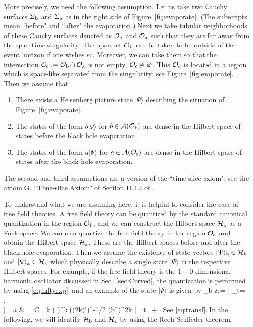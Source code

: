 \documentclass[a4paper,11pt]{article}
\theoremstyle{plain}
\theoremstyle{definition}
\numberwithin{thm}{section}
\newcommand{\ket}[1]{ | {#1} \rangle }
\def\CA{{\cal A}}
\def\CH{{\cal H}}
\def\CO{{\cal O}}
\def\beq#1\eeq{\begin{align}#1\end{align}}
\begin{document}
More precisely, we need the following assumption. Let us take two Cauchy surfaces $\Sigma_{\rm b}$ and $\Sigma_{\rm a}$
as in the right side of Figure~\ref{fig:evaporate}.  (The subscripts mean ``before" and ``after" the evaporation.)
Next we take tubular neighborhoods of these Cauchy surfaces denoted as 
$\CO_{\rm b}$ and $\CO_{\rm a}$ such that they are far away from the spacetime singularity.
The open set $\CO_{\rm b}$ can be taken to be outside of the event horizon if one wishes so. 
Moreover, we can take them so that the intersection $\CO_{\rm c}:= \CO_{\rm b} \cap \CO_{\rm a}$ is not empty, $\CO_{\rm c} \neq \varnothing$.
This $\CO_{\rm c}$ is located in a region which is space-like separated from the singularity: see Figure~\ref{fig:evaporate}.
Then we assume that
\begin{enumerate}
\item There exists a Heisenberg picture state $\ket{\Psi}$ describing the situation of Figure~\ref{fig:evaporate}.
\item The states of the form $ b\ket{\Psi}$ for $b \in \CA(\CO_{\rm b})$ are dense in the Hilbert space of states before the black hole evaporation.
\item The states of the form $ a\ket{\Psi}$ for $a \in \CA(\CO_{\rm a})$ are dense in the Hilbert space of states after the black hole evaporation.
\end{enumerate}
The second and third assumptions are a version of the ``time-slice axiom"; see the axiom G. ``Time-slice Axiom" of Section II.1.2 of \cite{Haag:1992hx}.

To understand what we are assuming here, it is helpful to consider the case of free field theories.
A free field theory can be quantized by the standard canonical quantization in the region $\CO_{\rm b}$, and we can construct the Hilbert space $\CH_{\rm b}$ as a Fock space.
We can also quantize the free field theory in the region $\CO_{\rm a}$ and obtain the Hilbert space $\CH_{\rm a}$. These are the Hilbert spaces before and after the
black hole evaporation. Then we assume the existence of state vectors $\ket{\Psi}_{\rm b} \in \CH_{\rm b}$ and $\ket{\Psi}_{\rm a} \in \CH_{\rm a}$ which physically describe a single state $\ket{\Psi}$
in the respective Hilbert spaces. For example, if the free field theory is the $1+0$-dimensional harmonic oscillator discussed in Sec.~\ref{sec:Curved},
the quantization is performed by using \eqref{eq:inftyexp}, and an example of the state $\ket{\Psi}$ is given by 
\beq
\ket{\Psi}_{\rm b} &=\ket{\Omega_{t=-\infty}}, \\
\ket{\Psi}_{\rm a} & = C \sum_{k }\left( \frac{\beta}{\alpha} \right)^k  \cdot  ((2k)!)^{-1/2} (b^\dagger)^{2k}\ket{\Omega_{t=+\infty}} .
\eeq
See \eqref{eq:transf}. In the following, we will identify $\CH_{\rm b}$ and $\CH_{\rm a}$ by using the Reeh-Schlieder theorem.
\end{document}
